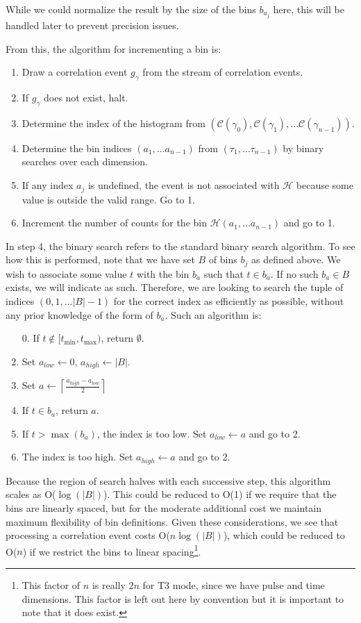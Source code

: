 \documentclass{article}
\newcommand{\abs}[1]{\ensuremath{\left|#1\right|}}
\newcommand{\Channel}{\ensuremath{\mathcal{C}}}
\newcommand{\photon}{\ensuremath{\gamma}}
\newcommand{\Histogram}{\ensuremath{\mathcal{H}}}
\newcommand{\ceil}[1]{\ensuremath{\left\lceil #1\right\rceil}}
\begin{document}
While we could normalize the result by the size of the bins $b_{a_{j}}$ here, this will be handled later to prevent precision issues. 

From this, the algorithm for incrementing a bin is:
\begin{enumerate}
\item Draw a correlation event $g_{\photon}$ from the stream of correlation events. 
\item If $g_{\photon}$ does not exist, halt.
\item Determine the index of the histogram from $(\Channel(\photon_{0}), \Channel(\photon_{1}),\ldots\Channel(\photon_{n-1}))$.
\item Determine the bin indices $(a_{1},\ldots a_{n-1})$ from $(\tau_{1},\ldots\tau_{n-1})$ by binary searches over each dimension.
\item If any index $a_{j}$ is undefined, the event is not associated with \Histogram{} because some value is outside the valid range. Go to 1.
\item Increment the number of counts for the bin $\Histogram(a_{1},\ldots a_{n-1})$ and go to 1.
\end{enumerate}
In step 4, the binary search refers to the standard binary search algorithm. To see how this is performed, note that we have set $B$ of bins $b_{j}$ as defined above. We wish to associate some value $t$ with the bin $b_{a}$ such that $t\in b_{a}$. If no such $b_{a}\in B$ exists, we will indicate as such. Therefore, we are looking to search the tuple of indices $(0,1,\ldots \abs{B}-1)$ for the correct index as efficiently as possible, without any prior knowledge of the form of $b_{a}$. Such an algorithm is:
\begin{enumerate}
\item[0.] If $t\not\in[t_{\min},t_{\max})$, return $\emptyset$.
\item Set $a_{low}\leftarrow 0$, $a_{high}\leftarrow\abs{B}$.
\item Set $a\leftarrow\ceil{\frac{a_{high}-a_{low}}{2}}$
\item If $t\in b_{a}$, return $a$.
\item If $t>\max(b_{a})$, the index is too low. Set $a_{low}\leftarrow a$ and go to 2.
\item The index is too high. Set $a_{high}\leftarrow a$ and go to 2.
\end{enumerate}
Because the region of search halves with each successive step, this algorithm scales as O($\log(\abs{B})$). This could be reduced to O(1) if we require that the bins are linearly spaced, but for the moderate additional cost we maintain maximum flexibility of bin definitions. Given these considerations, we see that processing a correlation event costs O($n\log(\abs{B})$), which could be reduced to O($n$) if we restrict the bins to linear spacing\footnote{This factor of $n$ is really $2n$ for T3 mode, since we have pulse and time dimensions. This factor is left out here by convention but it is important to note that it does exist.}.
\end{document}
